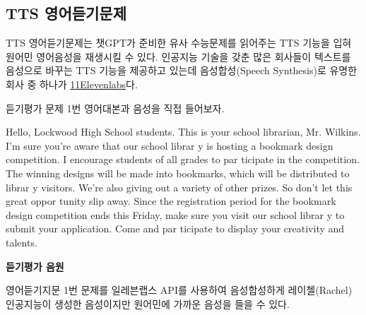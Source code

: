 \documentclass[
  letterpaper,
]{book}
\newenvironment{Shaded}{\begin{snugshade}}{\end{snugshade}}
\newcommand{\NormalTok}[1]{\textcolor[rgb]{0.00,0.23,0.31}{#1}}
\begin{document}
\begin{Shaded}
\end{Shaded}

\hypertarget{tts-uxc601uxc5b4uxb4e3uxae30uxbb38uxc81c}{%
\subsection{TTS
영어듣기문제}\label{tts-uxc601uxc5b4uxb4e3uxae30uxbb38uxc81c}}

TTS 영어듣기문제는 챗GPT가 준비한 유사 수능문제를 읽어주는 TTS 기능을
입혀 원어민 영어음성을 재생시킬 수 있다. 인공지능 기술을 갖춘 많은
회사들이 텍스트를 음성으로 바꾸는 TTS 기능을 제공하고 있는데
음성합성(Speech Synthesis)로 유명한 회사 중 하나가
\href{https://beta.elevenlabs.io/}{11Elevenlabs}다.

듣기평가 문제 1번 영어대본과 음성을 직접 들어보자.

\begin{Shaded}
\begin{Highlighting}[]
\NormalTok{Hello, Lockwood High School students. This is your school librarian, Mr. Wilkins. I’m sure you’re aware that our school librar y is hosting a bookmark design competition. I encourage students of all grades to par ticipate in the competition. The winning designs will be made into bookmarks, which will be distributed to librar y visitors. We’re also giving out a variety of other prizes. So don’t let this great oppor tunity slip away. Since the registration period for the bookmark design competition ends this Friday, make sure you visit our school librar y to submit your application. Come and par ticipate to display your creativity and talents.}
\end{Highlighting}
\end{Shaded}

\textbf{듣기평가 음원}

영어듣기지문 1번 문제를 일레븐랩스 API를 사용하여 음성합성하게
레이첼(Rachel) 인공지능이 생성한 음성이지만 원어민에 가까운 음성을 들을
수 있다.
\end{document}
